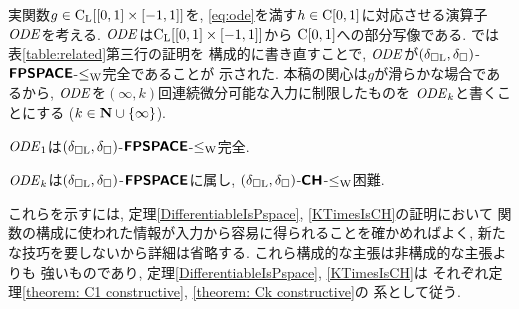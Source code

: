 
実関数$g \in \mathrm C _{\mathrm L} [[0, 1] \times [-1, 1]]$を, 
\eqref{eq:ode}を満す$h \in \mathrm C [0, 1]$に対応させる演算子$\mathit{ODE}$を考える. 
$\mathit{ODE}$は$\mathrm C _{\mathrm L} [[0, 1] \times [-1, 1]]$から
$\mathrm C [0, 1]$への部分写像である. 
\cite[Theorem~4.9]{kawamura2010operators}では表\ref{table:related}第三行の証明を
構成的に書き直すことで, 
$\mathit{ODE}$が$(\delta _{\square \mathrm L}, \delta _\square)$-$\text{\bfseries \sffamily \upshape FPSPACE}$-$\leq _{\mathrm W}$完全であることが
示された. 
本稿の関心は$g$が滑らかな場合であるから, 
$\mathit{ODE}$を$(\infty, k)$回連続微分可能な入力に制限したものを
$\mathit{ODE} _k$と書くことにする ($k \in \mathbf N \cup \{\infty\}$). 

\begin{theorem}
\label{theorem: C1 constructive}
$\mathit{ODE} _1$は$(\delta _{\square \mathrm L}, \delta _\square)$-$\text{\bfseries \sffamily \upshape FPSPACE}$-$\leq _{\mathrm W}$完全. 
\end{theorem}

\begin{theorem}
\label{theorem: Ck constructive}
$\mathit{ODE} _k$は$(\delta _{\square \mathrm L}, \delta _\square)$-$\text{\bfseries \sffamily \upshape FPSPACE}$に属し, 
$(\delta _{\square \mathrm L}, \delta _\square)$-$\text{\bfseries \sffamily \upshape CH}$-$\leq _{\mathrm W}$困難. 
\end{theorem}

これらを示すには, 
定理\ref{DifferentiableIsPspace}, \ref{KTimesIsCH}の証明において
関数の構成に使われた情報が入力から容易に得られることを確かめればよく, 
新たな技巧を要しないから詳細は省略する. 
これら構成的な主張は非構成的な主張よりも
強いものであり\cite[Lemmas 3.7, 3.8]{kawamura2010operators}, 
定理\ref{DifferentiableIsPspace}, \ref{KTimesIsCH}は
それぞれ定理\ref{theorem: C1 constructive}, \ref{theorem: Ck constructive}の
系として従う. 


